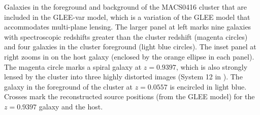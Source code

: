 \label{fig:LineOfSightLenses}
Galaxies in the foreground and background of the MACS0416 cluster that
are included in the GLEE-var model, which is a variation of the GLEE
model that accommodates multi-plane lensing. The larger panel at left
marks nine galaxies with spectroscopic redshifts greater than the
cluster redshift (magenta circles) and four galaxies in the cluster
foreground (light blue circles).  The inset panel at right zooms in on
the \spock host galaxy (enclosed by the orange ellipse in each panel).
The magenta circle marks a spiral galaxy at $z=0.9397$, which is also
strongly lensed by the  cluster into three highly distorted
images (System 12 in \citet{Caminha:2017}).  The galaxy in the foreground
of the cluster at $z=0.0557$ is encircled in light blue.  Crosses mark
the reconstructed source positions (from the GLEE model) for the
$z=0.9397$ galaxy and the \spock host.
